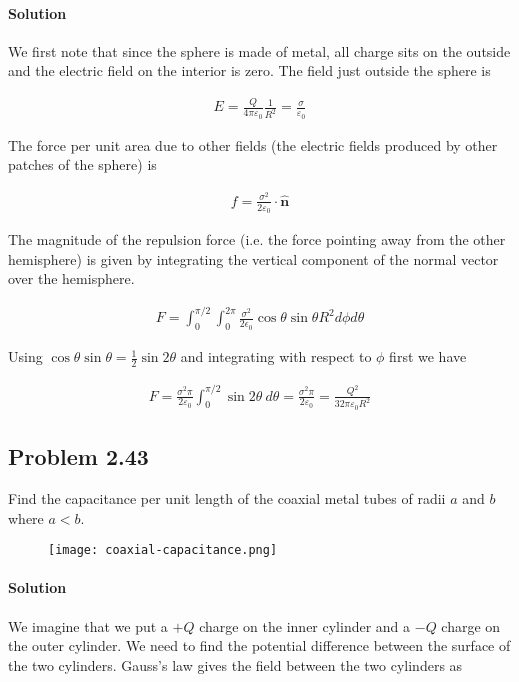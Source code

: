 \documentclass{article}
\newcommand{\bvec}[1]{\mathbf{\hat{#1}}}
\begin{document}
\paragraph{Solution} We first note that since the sphere is made of metal, all charge sits on the outside and the electric field on the interior is zero. The field just outside the sphere is 

\begin{align*}
    E = \frac{Q}{4\pi\varepsilon_0}\frac{1}{R^2} = \frac{\sigma}{\varepsilon_0}
\end{align*}

The force per unit area due to other fields (the electric fields produced by other patches of the sphere) is 

\begin{align*}
    f = \frac{\sigma^2}{2\varepsilon_0}\cdot \bvec{n}
\end{align*}

The magnitude of the repulsion force (i.e. the force pointing away from the other hemisphere) is given by integrating the vertical component of the normal vector over the hemisphere. 

\begin{align*}
    F = \int_0^{\pi/2} \int_0^{2\pi} \frac{\sigma^2}{2\epsilon_0}\cos{\theta}\sin{\theta}R^2d\phi d\theta
\end{align*}

Using $\cos\theta \sin\theta = \frac{1}{2}\sin2\theta$ and integrating with respect to $\phi$ first we have 

\begin{align*}
    F = \frac{\sigma^2\pi}{2\varepsilon_0}\int_0^{\pi/2}\sin2\theta\ d\theta = \frac{\sigma^2\pi}{2\varepsilon_0} = \frac{Q^2}{32\pi\varepsilon_0 R^2}
\end{align*}

\newpage

\subsection*{Problem 2.43}
Find the capacitance per unit length of the coaxial metal tubes of radii $a$ and $b$ where $a < b$.

\begin{figure}[h]
    \centering
    \texttt{[image: coaxial-capacitance.png]}
\end{figure}

\paragraph{Solution} We imagine that we put a $+Q$ charge on the inner cylinder and a $-Q$ charge on the outer cylinder. We need to find the potential difference between the surface of the two cylinders. Gauss's law gives the field between the two cylinders as 
\end{document}
